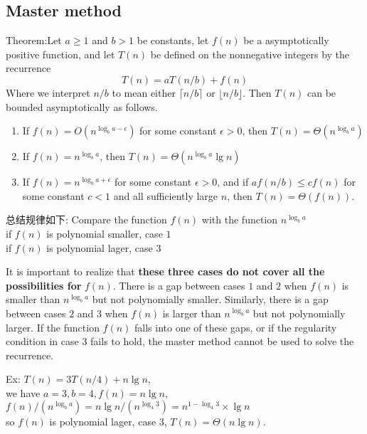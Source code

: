 \documentclass{article}
\begin{document}
\subsection{Master method}
Theorem:Let $a \geq 1$ and $b > 1$ be constants, let $f(n)$ be a asymptotically positive function, and let $T(n)$ be defined on the nonnegative integers by the recurrence
$$T(n) = aT(n/b) + f(n)$$
Where we interpret $n/b$ to mean either $\lceil n/b \rceil$ or $\lfloor n/b \rfloor$. Then $T(n)$ can be bounded asymptotically as follows.
\begin{enumerate}
	\item If $f(n) = O(n^{\log_b a - \epsilon})$ for some constant $\epsilon > 0$, then $T(n) = \Theta(n^{\log_b a})$
	\item If $f(n) = n^{\log_{b} a}$, then $T(n) = \Theta(n^{\log_b a} \lg n)$
	\item If $f(n) = n^{\log_{b} a + \epsilon}$ for some constant $\epsilon > 0$, and if $a f(n/b) \leq cf(n)$ for some constant $c < 1$ and all sufficiently large $n$, then $T(n) = \Theta(f(n))$.
\end{enumerate}

总结规律如下:
Compare the function $f(n)$ with the function  $n^{\log_b a}$\\
if $f(n)$ is polynomial smaller, case $1$\\
if $f(n)$ is polynomial lager, case $3$

It is important to realize that \textbf{these three cases do not cover all the possibilities for} $f(n)$.
There is a gap between cases $1$ and $2$ when $f(n)$ is smaller than $n^{\log_b a}$ but not polynomially smaller.
Similarly, there is a gap between cases $2$ and $3$ when $f(n)$ is larger than $n^{\log_b a}$ but not polynomially larger.
If the function $f(n)$ falls into one of these gaps, or if the regularity condition in case $3$ fails to hold,
the master method cannot be used to solve the recurrence.

Ex: $T(n) = 3T(n/4) + n \lg  n$,\\
we have $a = 3, b = 4, f (n) = n \lg  n$,\\
$f(n)/(n^{\log_b a})=n\lg n/(n^{\log_4 3})=n^{1 - \log_4 3} \times \lg n$\\
so $f(n)$ is polynomial lager, case $3$, $T(n) = \Theta(n\lg  n)$.
\end{document}
